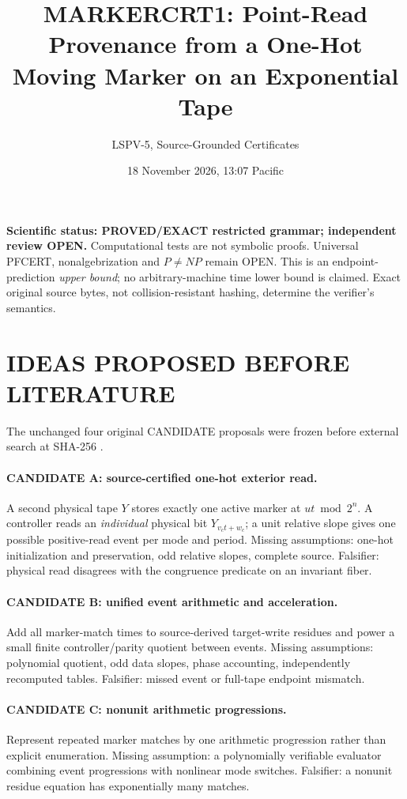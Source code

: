 \documentclass[11pt]{article}
\title{MARKERCRT1: Point-Read Provenance from a One-Hot Moving Marker on an Exponential Tape}
\author{LSPV-5, Source-Grounded Certificates}
\date{18 November 2026, 13:07 Pacific}
\begin{document}
\maketitle
\noindent\textbf{Scientific status: PROVED/EXACT restricted grammar; independent review OPEN.}
Computational tests are not symbolic proofs. Universal PFCERT, nonalgebrization and $P\ne NP$ remain OPEN. This is an endpoint-prediction \emph{upper bound}; no arbitrary-machine time lower bound is claimed. Exact original source bytes, not collision-resistant hashing, determine the verifier's semantics.

\section{IDEAS PROPOSED BEFORE LITERATURE}
The unchanged four original CANDIDATE proposals were frozen before external search at SHA-256 .
\paragraph{CANDIDATE A: source-certified one-hot exterior read.}
A second physical tape $Y$ stores exactly one active marker at $ut\bmod 2^n$. A controller reads an \emph{individual} physical bit $Y_{v_ct+w_c}$; a unit relative slope gives one possible positive-read event per mode and period. Missing assumptions: one-hot initialization and preservation, odd relative slopes, complete source. Falsifier: physical read disagrees with the congruence predicate on an invariant fiber.
\paragraph{CANDIDATE B: unified event arithmetic and acceleration.}
Add all marker-match times to source-derived target-write residues and power a small finite controller/parity quotient between events. Missing assumptions: polynomial quotient, odd data slopes, phase accounting, independently recomputed tables. Falsifier: missed event or full-tape endpoint mismatch.
\paragraph{CANDIDATE C: nonunit arithmetic progressions.}
Represent repeated marker matches by one arithmetic progression rather than explicit enumeration. Missing assumption: a polynomially verifiable evaluator combining event progressions with nonlinear mode switches. Falsifier: a nonunit residue equation has exponentially many matches.
\end{document}
